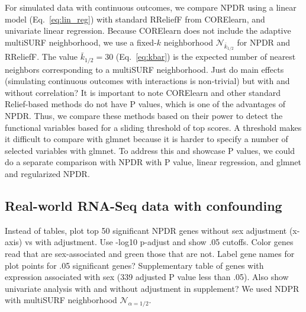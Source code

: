 \documentclass[10pt]{article}
\begin{document}
For simulated data with continuous outcomes, we compare NPDR using a linear model (Eq.~\ref{eq:lin_reg}) with standard RReliefF from CORElearn, and univariate linear regression. Because CORElearn does not include the adaptive multiSURF neighborhood, we use a fixed-$k$ neighborhood $\mathcal{N}_{\bar{k}_{1/2}}$ for NPDR and RReliefF. The value $\bar{k}_{1/2}=30$ (Eq.~\ref{eq:kbar}) is the expected number of nearest neighbors corresponding to a multiSURF neighborhood. Just do main effects (simulating continuous outcomes with interactions is non-trivial) but with and without correlation? It is important to note CORElearn and other standard Relief-based methods do not have P values, which is one of the advantages of NPDR. Thus, we compare these methods based on their power to detect the functional variables based for a sliding threshold of top scores. A threshold makes it difficult to compare with glmnet because it is harder to specify a number of selected variables with glmnet. To address this and showcase P values, we could do a separate comparison with NPDR with P value, linear regression, and glmnet and regularized NPDR.

\subsection{Real-world RNA-Seq data with confounding}

Instead of tables, plot top 50 significant NPDR genes without sex adjustment (x-axis) vs with adjustment. Use -log10 p-adjust and show .05 cutoffs. Color genes read that are sex-associated and green those that are not. Label gene names for plot points for .05 significant genes? Supplementary table of genes with expression associated with sex (339 adjusted P value less than .05). Also show univariate analysis with and without adjustment in supplement? We used NDPR with multiSURF neighborhood $\mathcal{N}_{\alpha=1/2}$.
\end{document}
